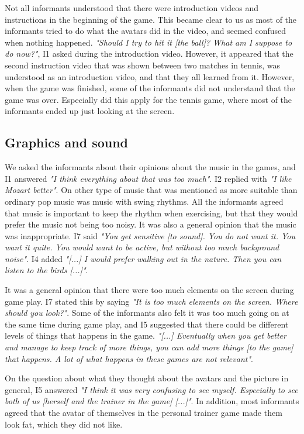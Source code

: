 Not all informants understood that there were introduction videos and instructions in the beginning of the game. This became clear to us as most of the informants tried to do what the avatars did in the video, and seemed confused when nothing happened. \emph{"Should I try to hit it [the ball]? What am I suppose to do now?"}, I1 asked during the introduction video. However, it appeared that the second instruction video that was shown between two matches in tennis, was understood as an introduction video, and that they all learned from it. However, when the game was finished, some of the informants did not understand that the game was over. Especially did this apply for the tennis game, where most of the informants ended up just looking at the screen.   

\subsection{Graphics and sound}

We asked the informants about their opinions about the music in the games, and I1 answered \emph{"I think everything about that was too much"}. I2 replied with \emph{"I like Mozart better"}. On other type of music that was mentioned as more suitable than ordinary pop music was music with swing rhythms. All the informants agreed that music is important to keep the rhythm when exercising, but that they would prefer the music not being too noisy. It was also a general opinion that the music was inappropriate.  I7 said \emph{"You get sensitive [to sound]. You do not want it. You want it quite. You would want to be active, but without too much background noise"}. I4 added \emph{"[...] I would prefer walking out in the nature. Then you can listen to the birds [...]"}.

It was a general opinion that there were too much elements on the screen during game play. I7 stated this by saying \emph{"It is too much elements on the screen. Where should you look?"}. Some of the informants also felt it was too much going on at the same time during game play, and I5 suggested that there could be different levels of things that happens in the game. \emph{"[...] Eventually when you get better and manage to keep track of more things, you can add more things [to the game] that happens. A lot of what happens in these games are not relevant"}. 

On the question about what they thought about the avatars and the picture in general, I5 answered \emph{"I think it was very confusing to see myself. Especially to see both of us [herself and the trainer in the game] [...]"}. In addition, most informants agreed that the avatar of themselves in the personal trainer game made them look fat, which they did not like.

